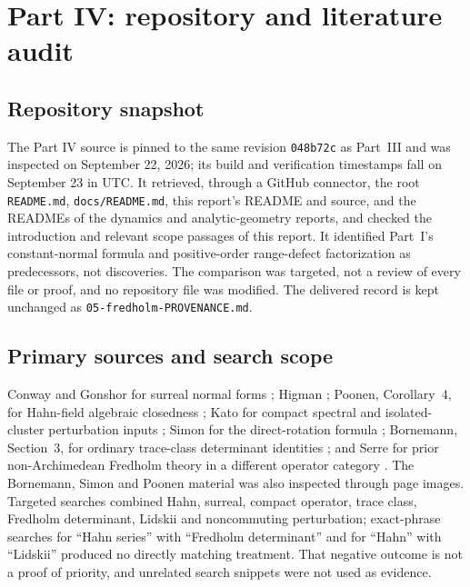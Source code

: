 \documentclass[11pt,a4paper]{article}
\numberwithin{equation}{section}
\theoremstyle{definition}
\theoremstyle{remark}
\begin{document}
\section{Part IV: repository and literature audit}\label{ihs:app:auditD}

\subsection{Repository snapshot}\label{ihs:app:snapshotD}
The Part IV source is pinned to the same revision \texttt{048b72c} as
Part~III and was inspected on September 22, 2026; its build and verification
timestamps fall on September 23 in UTC. It retrieved, through a GitHub
connector, the root \texttt{README.md}, \texttt{docs/README.md}, this
report's README and source, and the READMEs of the dynamics and
analytic-geometry reports, and checked the introduction and relevant scope
passages of this report. It identified Part~I's constant-normal formula and
positive-order range-defect factorization as predecessors, not discoveries.
The comparison was targeted, not a review of every file or proof, and no
repository file was modified. The delivered record is kept unchanged as
\texttt{05-fredholm-PROVENANCE.md}.

\subsection{Primary sources and search scope}\label{ihs:app:sourcesD}
Conway and Gonshor for surreal normal forms \cite{Conway,Gonshor}; Higman
\cite{Higman}; Poonen, Corollary~4, for Hahn-field algebraic closedness
\cite{Poonen}; Kato for compact spectral and isolated-cluster perturbation
inputs \cite{Kato}; Simon for the direct-rotation formula
\cite{SimonProjections}; Bornemann, Section~3, for ordinary trace-class
determinant identities \cite{Bornemann}; and Serre for prior
non-Archimedean Fredholm theory in a different operator category
\cite{Serre}. The Bornemann, Simon and Poonen material was also inspected
through page images. Targeted searches combined Hahn, surreal, compact
operator, trace class, Fredholm determinant, Lidskii and noncommuting
perturbation; exact-phrase searches for ``Hahn series'' with ``Fredholm
determinant'' and for ``Hahn'' with ``Lidskii'' produced no directly
matching treatment. That negative outcome is not a proof of priority, and
unrelated search snippets were not used as evidence.
\end{document}
